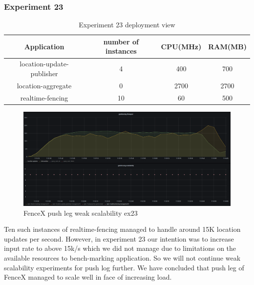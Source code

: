 \documentclass[a4]{report}
\begin{document}
    \subsubsection{Experiment 23}
    \begin{table}[h!]
        \centering
        \begin{tabular}{|c|c|c|c|}
            \hline
            Application               & number of instances & CPU(MHz) & RAM(MB) \\
            \hline
            location-update-publisher & 4                   & 400      & 700     \\
            location-aggregate        & 0                   & 2700     & 2700    \\
            realtime-fencing          & 10                  & 60       & 500     \\
            \hline
        \end{tabular}
        \caption{Experiment 23 deployment view}
        \label{table:ex23-dv}
    \end{table}

    \begin{figure}[h!]
        \caption{FenceX push leg weak scalability ex23}
        \label{fig:ex23}
        \includegraphics[scale=0.4]{images/evaluation/ex23-benchmarking-ongoing-2per2sec.png}
    \end{figure}
    Ten such instances of realtime-fencing managed to handle around 15K location updates per second.
    However, in experiment 23 our intention was to increase input rate to above 15k/s which we did not manage due to
    limitations on the available resources to bench-marking application.
    So we will not continue weak scalability experiments for push log further.
    We have concluded that push leg of FenceX managed to scale well in face of increasing load.
\end{document}
